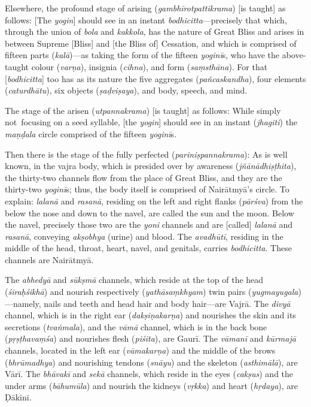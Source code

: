\documentclass[naipra.tex]{subfiles}
\begin{document}
Elsewhere, the profound stage of arising (\emph{gambhīrotpattikrama}) [is taught] as follows:
[The \emph{yogin}] should see in an instant \emph{bodhicitta}—precisely that which, through the union of \emph{bola} and \emph{kakkola}, has the nature of Great Bliss and arises in between Supreme [Bliss] and [the Bliss of] Cessation, and which is comprised of fifteen parts (\emph{kalā})—as taking the form of the fifteen \emph{yoginī}s, who have the above-taught colour (\emph{varṇa}), insignia (\emph{cihna}), and form (\emph{saṃsthāna}).
For that [\emph{bodhicitta}] too has as its nature the five aggregates (\emph{pañcaskandha}), four elements (\emph{caturdhātu}), six objects (\emph{ṣaḍviṣaya}), and body, speech, and mind.

The stage of the arisen (\emph{utpannakrama}) [is taught] as follows:
While simply \crux not\crux\ focusing on a seed syllable, [the \emph{yogin}] should see in an instant (\emph{jhagiti}) the \emph{maṇḍala} circle comprised of the fifteen \emph{yoginī}s.

Then there is the stage of the fully perfected (\emph{pariniṣpannakrama}):
As is well known, in the vajra body, which is presided over by awareness (\emph{jñānādhiṣṭhita}), the thirty-two channels flow from the place of Great Bliss, and they are the thirty-two \emph{yoginī}s; thus, the body itself is comprised of Nairātmyā's circle.
To explain: \emph{lalanā} and \emph{rasanā}, residing on the left and right flanks (\emph{pārśva}) from the below the nose and down to the navel, are called the sun and the moon.
Below the navel, precisely those two are the \emph{yoni} channels and are [called] \emph{lalanā} and \emph{rasanā}, conveying \emph{akṣobhya} (urine) and blood.
The \emph{avadhūtī}, residing in the middle of the head, throat, heart, navel, and genitals, carries \emph{bodhicitta}.
These channels are Nairātmyā.

The \emph{abhedyā} and \emph{sūkṣmā} channels, which reside at the top of the head (\emph{śiraḥśikhā}) and nourish respectively (\emph{yathāsaṃkhyam}) twin pairs (\emph{yugmayugala})—namely, nails and teeth and head hair and body hair—are Vajrā.
The \emph{divyā} channel, which is in the right ear (\emph{dakṣiṇakarṇa}) and nourishes the skin and its secretions (\emph{tvaṅmala}), and the \emph{vāmā} channel, which is in the back bone (\emph{pṛṣṭhavaṃśa}) and nourishes flesh (\emph{piśita}), are Gaurī.
The \emph{vāmanī} and \emph{kūrmajā} channels, located in the left ear (\emph{vāmakarṇa}) and the middle of the brows (\emph{bhrūmadhya}) and nourishing tendons (\emph{snāyu}) and the skeleton (\emph{asthimālā}), are Vārī.
The \emph{bhāvakī} and \emph{sekā} channels, which reside in the eyes (\emph{cakṣus}) and the under arms (\emph{bāhumūla}) and nourish the kidneys (\emph{vṛkka}) and heart (\emph{hṛdaya}), are Ḍākinī.
\end{document}
